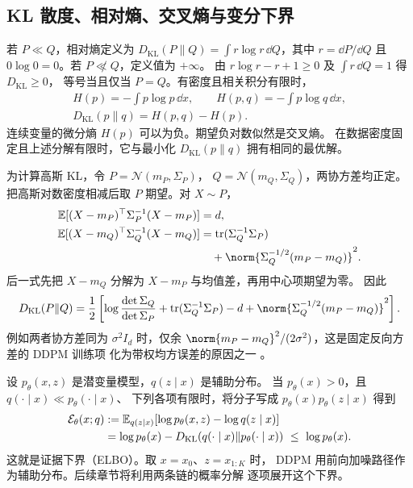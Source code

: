 \subsection{KL 散度、相对熵、交叉熵与变分下界\requiredderivation}

若 \(P\ll Q\)，相对熵定义为
\(D_{\mathrm{KL}}(P\|Q)=\int r\log r\,\dd Q\)，其中
\(r=\dd P/\dd Q\) 且 \(0\log 0=0\)。若 \(P\not\ll Q\)，定义值为 \(+\infty\)。
由 \(r\log r-r+1\ge0\) 及 \(\int r\,\dd Q=1\) 得 \(D_{\mathrm{KL}}\ge0\)，
等号当且仅当 \(P=Q\)。有密度且相关积分有限时，
\begin{gather*}
  H(p)=-\int p\log p\,\dd x,\qquad H(p,q)=-\int p\log q\,\dd x,\\
  D_{\mathrm{KL}}(p\|q)=H(p,q)-H(p).
\end{gather*}
连续变量的微分熵 \(H(p)\) 可以为负。期望负对数似然是交叉熵。
在数据密度固定且上述分解有限时，它与最小化 \(D_{\mathrm{KL}}(p\|q)\)
拥有相同的最优解。

为计算高斯 KL，令 \(P=\mathcal N(m_P,\Sigma_P)\)，
\(Q=\mathcal N(m_Q,\Sigma_Q)\)，两协方差均正定。
把高斯对数密度相减后取 \(P\) 期望。对 \(X\sim P\)，
\begin{align*}
  \mathbb E[(X-m_P)^\top\Sigma_P^{-1}(X-m_P)] &=d,\\
  \mathbb E[(X-m_Q)^\top\Sigma_Q^{-1}(X-m_Q)]
    &=\operatorname{tr}(\Sigma_Q^{-1}\Sigma_P)\\
    &\quad+\norm{\Sigma_Q^{-1/2}(m_P-m_Q)}^2 .
\end{align*}
后一式先把 \(X-m_Q\) 分解为 \(X-m_P\) 与均值差，再用中心项期望为零。
因此
\begin{equation}
  D_{\mathrm{KL}}(P\|Q)=\frac12\left[
    \log\frac{\det\Sigma_Q}{\det\Sigma_P}
    +\operatorname{tr}(\Sigma_Q^{-1}\Sigma_P)-d
    +\norm{\Sigma_Q^{-1/2}(m_P-m_Q)}^2
  \right].
  \label{eq:foundations-gaussian-kl}
\end{equation}
例如两者协方差同为 \(\sigma^2 I_d\) 时，仅余
\(\norm{m_P-m_Q}^2/(2\sigma^2)\)，这是固定反向方差的 DDPM 训练项
化为带权均方误差的原因之一 \cite{ho2020ddpm}。

设 \(p_\theta(x,z)\) 是潜变量模型，\(q(z\mid x)\) 是辅助分布。
当 \(p_\theta(x)>0\)，且 \(q(\cdot\mid x)\ll p_\theta(\cdot\mid x)\)、
下列各项有限时，将分子写成 \(p_\theta(x)p_\theta(z\mid x)\) 得到
\begin{align}
  \mathcal E_\theta(x;q)
    &:=\mathbb E_{q(z\mid x)}
       [\log p_\theta(x,z)-\log q(z\mid x)] \notag\\
    &=\log p_\theta(x)
       -D_{\mathrm{KL}}(q(\cdot\mid x)\|p_\theta(\cdot\mid x))
       \ \le\ \log p_\theta(x).
       \label{eq:foundations-elbo}
\end{align}
这就是证据下界（ELBO）。取 \(x=x_0\)、\(z=x_{1:K}\) 时，
DDPM 用前向加噪路径作为辅助分布。后续章节将利用两条链的概率分解
逐项展开这个下界。

